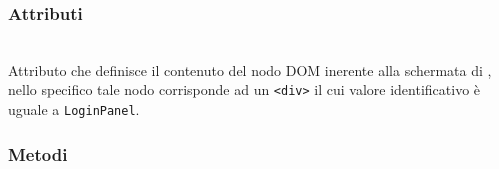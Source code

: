 \subsubsection*{Attributi}
\begin{description}

\item{}\\
Attributo che definisce il contenuto del nodo DOM inerente alla schermata di , nello specifico tale nodo corrisponde ad un \verb+<div>+ il cui valore identificativo è uguale a \texttt{LoginPanel}.

\end{description}

\subsubsection*{Metodi}
